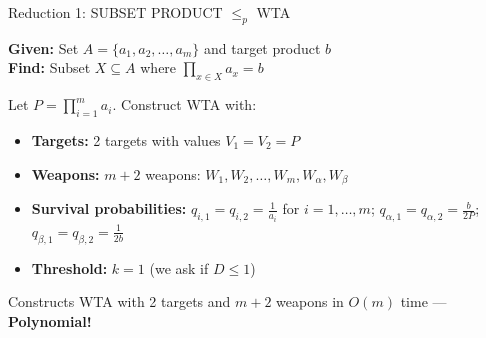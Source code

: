 \documentclass[aspectratio=169,10pt]{beamer}
\begin{document}
\begin{frame}{Reduction 1: SUBSET PRODUCT $\leq_p$ WTA}


  \vspace{0.15cm}
  {\footnotesize
  \textbf{Given:} Set $A = \{a_1, a_2, \ldots, a_m\}$ and target product $b$\\
  \textbf{Find:} Subset $X \subseteq A$ where $\prod_{x \in X} a_x = b$
  }

  \vspace{0.25cm}


  \vspace{0.15cm}
  {\footnotesize
  Let $P = \prod_{i=1}^{m} a_i$. Construct WTA with:
  \begin{itemize}
    \setlength\itemsep{2pt}
    \item[\color{goldaccent}$\blacktriangleright$] \textbf{Targets:} 2 targets with values $V_1 = V_2 = P$
    \item[\color{goldaccent}$\blacktriangleright$] \textbf{Weapons:} $m+2$ weapons: $W_1, W_2, \ldots, W_m, W_\alpha, W_\beta$
    \item[\color{goldaccent}$\blacktriangleright$] \textbf{Survival probabilities:} $q_{i,1} = q_{i,2} = \frac{1}{a_i}$ for $i=1,\ldots,m$; \quad $q_{\alpha,1} = q_{\alpha,2} = \frac{b}{2P}$; \quad $q_{\beta,1} = q_{\beta,2} = \frac{1}{2b}$
    \item[\color{goldaccent}$\blacktriangleright$] \textbf{Threshold:} $k = 1$ (we ask if $D \leq 1$)
  \end{itemize}
  }

  \vspace{0.25cm}


  \vspace{0.1cm}
  {\footnotesize
  Constructs WTA with 2 targets and $m+2$ weapons in $O(m)$ time --- \textbf{Polynomial!}
  }

\end{frame}
\end{document}
